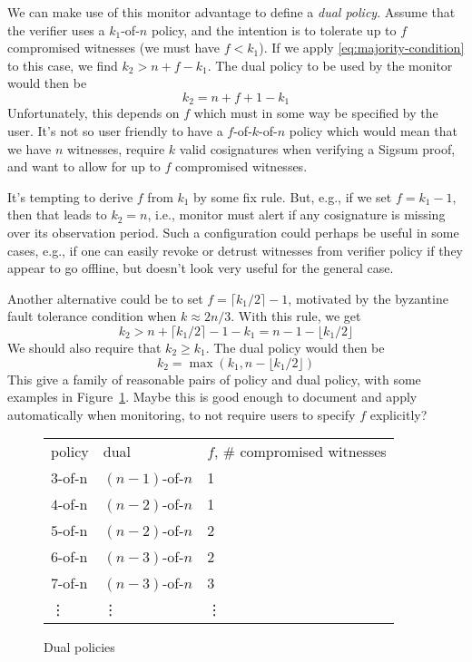 \documentclass[a4paper]{article}
\newcommand{\floor}[1]{\lfloor #1 \rfloor}
\newcommand{\ceil}[1]{\lceil #1 \rceil}
\begin{document}
We can make use of this monitor advantage to define a \emph{dual
  policy}. Assume that the verifier uses a $k_1$-of-$n$ policy, and the
intention is to tolerate up to $f$ compromised witnesses (we must have
$f < k_1$). If we apply \eqref{eq:majority-condition} to this case, we
find $k_2 > n + f - k_1$. The dual policy to be used by the monitor
would then be
\begin{equation}
  k_2 = n + f + 1 - k_1
\end{equation}
Unfortunately, this depends on $f$ which must in some way be specified
by the user. It's not so user friendly to have a $f$-of-$k$-of-$n$
policy which would mean that we have $n$ witnesses, require $k$ valid
cosignatures when verifying a Sigsum proof, and want to allow for up
to $f$ compromised witnesses.

It's tempting to derive $f$ from $k_1$ by some fix rule. But, e.g., if
we set $f = k_1 - 1$, then that leads to $k_2 = n$, i.e., monitor must
alert if any cosignature is missing over its observation period. Such
a configuration could perhaps be useful in some cases, e.g., if one
can easily revoke or detrust witnesses from verifier policy if they
appear to go offline, but doesn't look very useful for the general
case.

Another alternative could be to set $f = \ceil{k_1/2} - 1$, motivated
by the byzantine fault tolerance condition when $k \approx 2n/3$. With
this rule, we get
\begin{equation}
  k_2 > n + \ceil{k_1/2} - 1 - k_1 = n - 1 - \floor{k_1/2}
\end{equation}
We should also require that $k_2 \geq k_1$. The dual policy would then
be
\begin{equation}
  k_2 = \max (k_1, n - \floor{k_1/2})
\end{equation}
This give a family of reasonable pairs of policy and dual policy, with
some examples in Figure~\ref{fig:dual-policies}. Maybe this is good
enough to document and apply automatically when monitoring, to not
require users to specify $f$ explicitly?

\begin{figure}[t]
  \centering
  \begin{tabular}{lll}
    policy & dual & $f$, \# compromised witnesses \\
    $3$-of-n & $(n-1)$-of-$n$ & 1 \\
    $4$-of-n & $(n-2)$-of-$n$ & 1 \\
    $5$-of-n & $(n-2)$-of-$n$ & 2 \\
    $6$-of-n & $(n-3)$-of-$n$ & 2 \\
    $7$-of-n & $(n-3)$-of-$n$ & 3 \\
    \vdots & \vdots & \vdots
  \end{tabular}
  \caption{Dual policies}
  \label{fig:dual-policies}
\end{figure}
\end{document}
